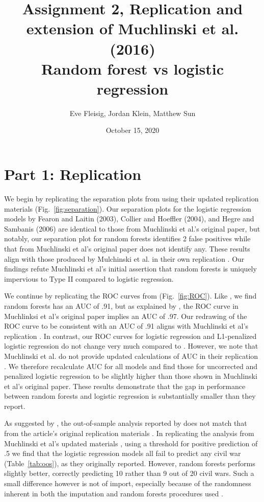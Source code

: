 \documentclass{article}
\title{Assignment 2, Replication and extension of Muchlinski et al. (2016)\\Random forest vs logistic regression}
\date{October 15, 2020}
\author{Eve Fleisig, Jordan Klein, Matthew Sun}
\begin{document}
\maketitle

\section*{Part 1: Replication}

We begin by replicating the separation plots from \cite{muchlinski2016comparing}
using their updated replication materials (Fig.~\ref{fig:separation}). Our separation plots for the logistic regression models by Fearon and Laitin (2003), Collier and Hoeffler (2004), and Hegre and Sambanis (2006) are identical to those from Muchlinski et al.'s original paper, but notably, our separation plot for random forests identifies 2 false positives while that from Muchlinski et al's original paper does not identify any. These results align with those produced by Mulchinski et al. in their own replication \citep{muchlinski_2019}. Our findings refute Muchlinski et al's initial assertion that random forests is uniquely impervious to Type II compared to logistic regression.

We continue by replicating the ROC curves from \cite{muchlinski2016comparing} (Fig.~\ref{fig:ROC}). Like \cite{muchlinski2016comparing}, we find random forests has an AUC of .91, but as explained by \cite{wang_comparing_2019}, the ROC curve in Muchlinksi et al's original paper implies an AUC of .97. Our redrawing of the ROC curve to be consistent with an AUC of .91 aligns with Muchlinski et al's replication \citep{muchlinski_2019}. In contrast, our ROC curves for logistic regression and L1-penalized logistic regression do not change very much compared to \cite{muchlinski2016comparing}. However, we note that Muchlinski et al. do not provide updated calculations of AUC in their replication \citep{muchlinski_2019}. We therefore recalculate AUC for all models and find those for uncorrected and penalized logistic regression to be slightly higher than those shown in Muchlinski et al's original paper. These results demonstrate that the gap in performance between random forests and logistic regression is substantially smaller than they report.

As suggested by \cite{neunhoeffer_how_2019}, the out-of-sample analysis reported by \cite{muchlinski2016comparing} does not match that from the article's original replication materials \citep{muchlinski_replication_2015}. In replicating the analysis from Muchlinski et al's updated materials \citep{muchlinski_2019}, using a threshold for positive prediction of .5 we find that the logistic regression models all fail to predict any civil war (Table~\ref{tab:oos}), as they originally reported. However, random forests performs slightly better, correctly predicting 10 rather than 9 out of 20 civil wars. Such a small difference however is not of import, especially because of the randomness inherent in both the imputation and random forests procedures used \citep{muchlinski_seeing_2019}. 
\end{document}
